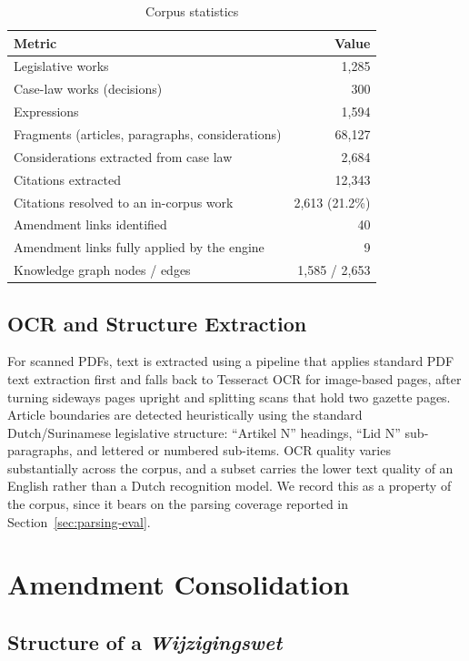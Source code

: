 \documentclass{IOS-Book-Article}
\begin{document}
\begin{table}[h]
\caption{Corpus statistics}
\label{tab:stats}
\begin{tabular}{|l|r|}
\hline
\textbf{Metric} & \textbf{Value} \\
\hline
Legislative works & 1,285 \\
Case-law works (decisions) & 300 \\
Expressions & 1,594 \\
Fragments (articles, paragraphs, considerations) & 68,127 \\
Considerations extracted from case law & 2,684 \\
Citations extracted & 12,343 \\
Citations resolved to an in-corpus work & 2,613 (21.2\%) \\
Amendment links identified & 40 \\
Amendment links fully applied by the engine & 9 \\
Knowledge graph nodes / edges & 1,585 / 2,653 \\
\hline
\end{tabular}
\end{table}

\subsection{OCR and Structure Extraction}

For scanned PDFs, text is extracted using a pipeline that applies standard PDF text
extraction first and falls back to Tesseract OCR \cite{smith2007} for image-based pages,
after turning sideways pages upright and splitting scans that hold two gazette pages. Article boundaries
are detected heuristically using the standard Dutch/Surinamese legislative structure:
``Artikel N'' headings, ``Lid N'' sub-paragraphs, and lettered or numbered sub-items. OCR quality
varies substantially across the corpus, and a subset carries the lower text quality of an
English rather than a Dutch recognition model. We record this as a property of the
corpus, since it bears on the parsing coverage reported in Section~\ref{sec:parsing-eval}.

\section{Amendment Consolidation}
\label{sec:consolidation}

\subsection{Structure of a \emph{Wijzigingswet}}
\end{document}
